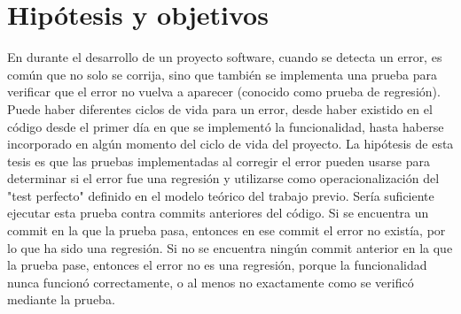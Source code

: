 \section{Hipótesis y objetivos}
\label{sec:resumen:hipotesis}

En durante el desarrollo de un proyecto software, cuando se detecta un error, es común que no solo se corrija, sino que también se implementa una prueba para verificar que el error no vuelva a aparecer (conocido como prueba de regresión). 
Puede haber diferentes ciclos de vida para un error, desde haber existido en el código desde el primer día en que se implementó la funcionalidad, hasta haberse incorporado en algún momento del ciclo de vida del proyecto.
La hipótesis de esta tesis es que las pruebas implementadas al corregir el error pueden usarse para determinar si el error fue una regresión y utilizarse como operacionalización del "test perfecto" definido en el modelo teórico del trabajo previo. 
Sería suficiente ejecutar esta prueba contra commits anteriores del código. 
Si se encuentra un commit en la que la prueba pasa, entonces en ese commit el error no existía, por lo que ha sido una regresión. 
Si no se encuentra ningún commit anterior en la que la prueba pase, entonces el error no es una regresión, porque la funcionalidad nunca funcionó correctamente, o al menos no exactamente como se verificó mediante la prueba.

